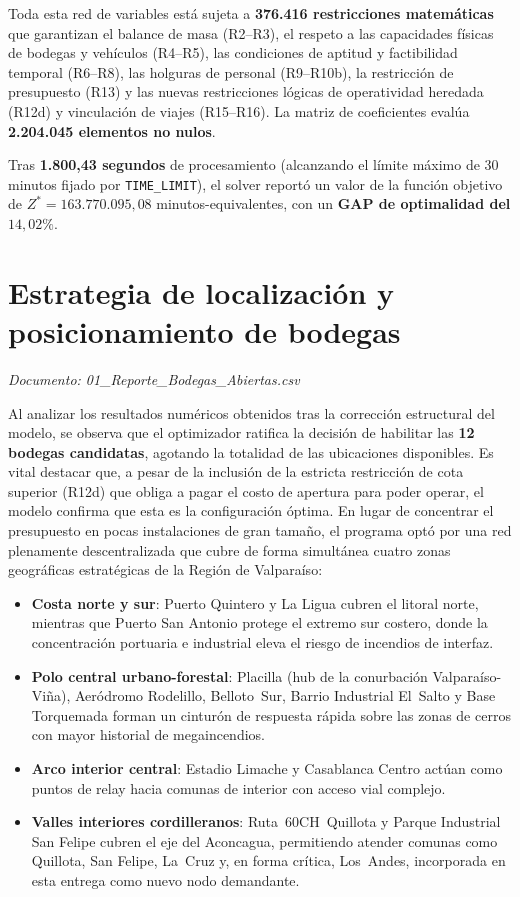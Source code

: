 \documentclass[letterpaper]{article}
\begin{document}
Toda esta red de variables está sujeta a \textbf{376.416 restricciones
matemáticas} que garantizan el balance de masa (R2--R3), el respeto a las
capacidades físicas de bodegas y vehículos (R4--R5), las condiciones de
aptitud y factibilidad temporal (R6--R8), las holguras de personal (R9--R10b),
la restricción de presupuesto (R13) y las nuevas restricciones lógicas de 
operatividad heredada (R12d) y vinculación de viajes (R15--R16). La matriz de 
coeficientes evalúa \textbf{2.204.045 elementos no nulos}.

Tras \textbf{1.800,43 segundos} de procesamiento (alcanzando el límite
máximo de 30 minutos fijado por \texttt{TIME\_LIMIT}), el solver reportó un valor de la función objetivo de
$Z^* = 163.770.095{,}08$ minutos-equivalentes, con un \textbf{GAP de optimalidad del
$14{,}02\%$}.
\section{Estrategia de localización y posicionamiento de bodegas}

\textit{Documento: 01\_Reporte\_Bodegas\_Abiertas.csv}

Al analizar los resultados numéricos obtenidos tras la corrección estructural del modelo, se observa que el optimizador ratifica la decisión de
habilitar las \textbf{12 bodegas candidatas}, agotando la totalidad de las
ubicaciones disponibles. Es vital destacar que, a pesar de la inclusión de la estricta restricción de cota superior (R12d) que obliga a pagar el costo de apertura para poder operar, el modelo confirma que esta es la configuración óptima. En lugar de concentrar el presupuesto en pocas instalaciones de gran tamaño, el programa optó por una red plenamente descentralizada que cubre de forma simultánea cuatro zonas geográficas estratégicas de la Región de Valparaíso:

\begin{itemize}[leftmargin=2em, itemsep=3pt]
  \item \textbf{Costa norte y sur}: Puerto Quintero y La Ligua cubren el litoral
    norte, mientras que Puerto San Antonio protege el extremo sur costero, donde
    la concentración portuaria e industrial eleva el riesgo de incendios
    de interfaz.
  \item \textbf{Polo central urbano-forestal}: Placilla (hub de la conurbación
    Valparaíso-Viña), Aeródromo Rodelillo, Belloto~Sur, Barrio Industrial
    El~Salto y Base Torquemada forman un cinturón de respuesta rápida sobre las
    zonas de cerros con mayor historial de megaincendios.
  \item \textbf{Arco interior central}: Estadio Limache y Casablanca Centro
    actúan como puntos de relay hacia comunas de interior con acceso vial
    complejo.
  \item \textbf{Valles interiores cordilleranos}: Ruta~60CH~Quillota y Parque
    Industrial San Felipe cubren el eje del Aconcagua, permitiendo atender
    comunas como Quillota, San Felipe, La~Cruz y, en forma crítica, Los~Andes,
    incorporada en esta entrega como nuevo nodo demandante.
\end{itemize}
\end{document}
